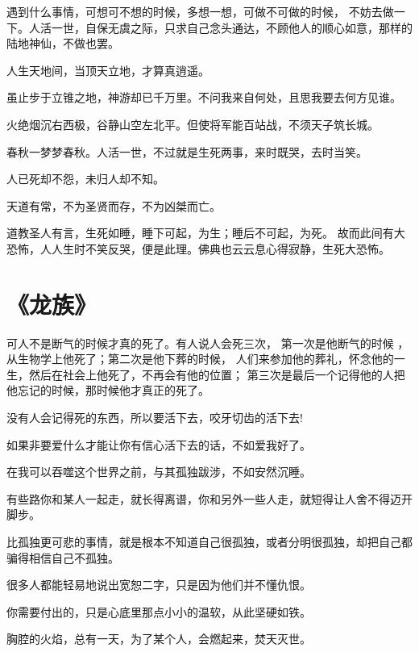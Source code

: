 \documentclass[UTF8,oneside]{ctexbook}
\begin{document}
\mfApache \quad 遇到什么事情，可想可不想的时候，多想一想，可做不可做的时候，
不妨去做一下。人活一世，自保无虞之际，只求自己念头通达，不顾他人的顺心如意，那样的
陆地神仙，不做也罢。

\mfApache \quad 人生天地间，当顶天立地，才算真逍遥。

\mfApache \quad 虽止步于立锥之地，神游却已千万里。不问我来自何处，且思我要去何方见谁。

\mfApache \quad 火绝烟沉右西极，谷静山空左北平。但使将军能百站战，不须天子筑长城。

\mfApache \quad 春秋一梦梦春秋。人活一世，不过就是生死两事，来时既哭，去时当笑。 

\mfApache \quad 人已死却不怨，未归人却不知。

\mfApache \quad 天道有常，不为圣贤而存，不为凶桀而亡。

\mfApache \quad 道教圣人有言，生死如睡，睡下可起，为生；睡后不可起，为死。
故而此间有大恐怖，人人生时不笑反哭，便是此理。佛典也云云息心得寂静，生死大恐怖。

\mfApache \quad 

\section{《龙族》}
\mfApache \quad 可人不是断气的时候才真的死了。有人说人会死三次，
第一次是他断气的时候 ，从生物学上他死了；第二次是他下葬的时候，
人们来参加他的葬礼，怀念他的一生，然后在社会上他死了，不再会有他的位置；
第三次是最后一个记得他的人把他忘记的时候，那时候他才真正的死了。

\mfApache \quad 没有人会记得死的东西，所以要活下去，咬牙切齿的活下去!

\mfApache \quad 如果非要爱什么才能让你有信心活下去的话，不如爱我好了。

\mfApache \quad 在我可以吞噬这个世界之前，与其孤独跋涉，不如安然沉睡。

\mfApache \quad 有些路你和某人一起走，就长得离谱，你和另外一些人走，就短得让人舍不得迈开脚步。

\mfApache \quad 比孤独更可悲的事情，就是根本不知道自己很孤独，或者分明很孤独，却把自己都骗得相信自己不孤独。

\mfApache \quad 很多人都能轻易地说出宽恕二字，只是因为他们并不懂仇恨。

\mfApache \quad 你需要付出的，只是心底里那点小小的温软，从此坚硬如铁。

\mfApache \quad 胸腔的火焰，总有一天，为了某个人，会燃起来，焚天灭世。
\end{document}
